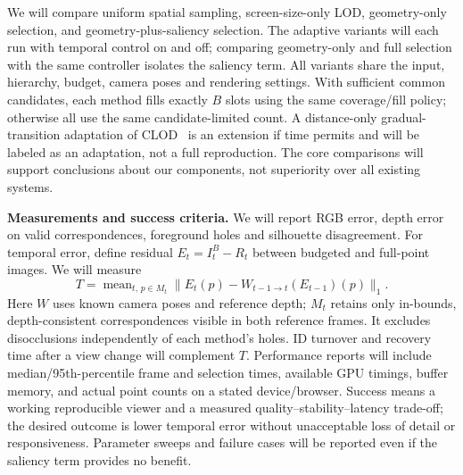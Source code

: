 \documentclass[a4paper]{article}
\begin{document}
We will compare uniform spatial sampling, screen-size-only LOD, geometry-only selection, and geometry-plus-saliency selection. The adaptive variants will each run with temporal control on and off; comparing geometry-only and full selection with the same controller isolates the saliency term. All variants share the input, hierarchy, budget, camera poses and rendering settings. With sufficient common candidates, each method fills exactly $B$ slots using the same coverage/fill policy; otherwise all use the same candidate-limited count. A distance-only gradual-transition adaptation of CLOD~\cite{clod2019} is an extension if time permits and will be labeled as an adaptation, not a full reproduction. The core comparisons will support conclusions about our components, not superiority over all existing systems.

\textbf{Measurements and success criteria.}
We will report RGB error, depth error on valid correspondences, foreground holes and silhouette disagreement. For temporal error, define residual $E_t=I_t^B-R_t$ between budgeted and full-point images. We will measure
\begin{equation}
 T=\operatorname{mean}_{t,\,p\in M_t}
 \bigl\|E_t(p)-W_{t-1\rightarrow t}(E_{t-1})(p)\bigr\|_1.
 \label{eq:temporal}
\end{equation}
Here $W$ uses known camera poses and reference depth; $M_t$ retains only in-bounds, depth-consistent correspondences visible in both reference frames. It excludes disocclusions independently of each method's holes. ID turnover and recovery time after a view change will complement $T$. Performance reports will include median/95th-percentile frame and selection times, available GPU timings, buffer memory, and actual point counts on a stated device/browser. Success means a working reproducible viewer and a measured quality--stability--latency trade-off; the desired outcome is lower temporal error without unacceptable loss of detail or responsiveness. Parameter sweeps and failure cases will be reported even if the saliency term provides no benefit.
\end{document}

